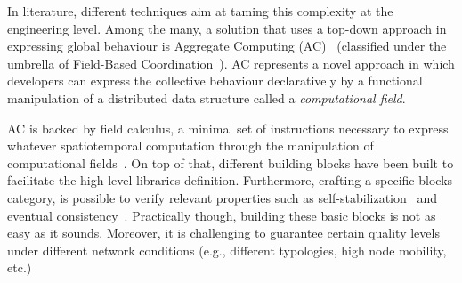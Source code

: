 \documentclass[conference]{IEEEtran}
\begin{document}
In literature, different techniques aim at taming this complexity at the engineering level.
%
Among the many, a solution that uses a top-down approach in expressing global behaviour is Aggregate Computing (AC)~\cite{DBLP:journals/computer/BealPV15} (classified under the umbrella of Field-Based Coordination~\cite{DBLP:books/daglib/0015276}).
%
AC represents a novel approach in which developers can express the collective behaviour declaratively by a functional manipulation of a distributed data structure called a \emph{computational field}.

AC is backed by field calculus, a minimal set of instructions necessary to express whatever spatiotemporal computation through the manipulation of computational fields~\cite{DBLP:conf/coordination/AudritoBDV18}. 
%
On top of that, different building blocks have been built to facilitate the high-level libraries definition.
%
Furthermore, crafting a specific blocks category, is possible to verify relevant properties such as self-stabilization~\cite{DBLP:conf/coordination/ViroliD14} and eventual consistency~\cite{DBLP:conf/saso/BealVPD16}.
%
Practically though, building these basic blocks is not as easy as it sounds. 
%
Moreover, it is challenging to guarantee certain quality levels under different network conditions (e.g., different typologies, high node mobility, etc.)
\end{document}
